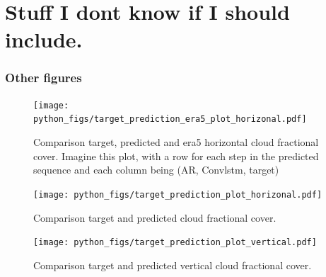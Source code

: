 \chapter{Stuff I dont know if I should include.}



\subsection{Other figures}
\begin{figure}[ht]
    \centering
    \texttt{[image: python\_figs/target\_prediction\_era5\_plot\_horizonal.pdf]}
    \caption{Comparison target, predicted and era5 horizontal cloud fractional cover. Imagine this plot, with a row for each step in the predicted sequence and each column being (AR, Convlstm, target)}
    \label{fig:target_predict_era5_horizontal}
\end{figure}

\begin{figure}[ht]
    \centering
    \texttt{[image: python\_figs/target\_prediction\_plot\_horizonal.pdf]}
    \caption{Comparison target and predicted cloud fractional cover.}
    \label{fig:target_predict_horizontal}
\end{figure}

\begin{figure}[ht]
    \centering
    \texttt{[image: python\_figs/target\_prediction\_plot\_vertical.pdf]}
    \caption{Comparison target and predicted vertical cloud fractional cover.}
    \label{fig:target_predict_vertical}
\end{figure}
